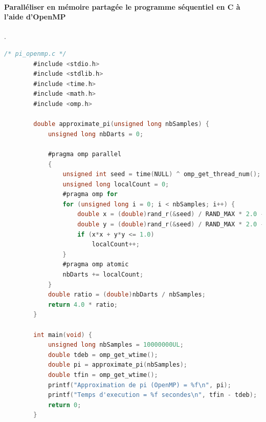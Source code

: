 \documentclass[a4paper,13pt]{book}
\begin{document}
\paragraph{Paralléliser en mémoire partagée le programme séquentiel en C à l'aide d’OpenMP}.\\


	\begin{lstlisting}[language=C]
        /* pi_openmp.c */
        #include <stdio.h>
        #include <stdlib.h>
        #include <time.h>
        #include <math.h>
        #include <omp.h>
        
        double approximate_pi(unsigned long nbSamples) {
            unsigned long nbDarts = 0;
        
            #pragma omp parallel
            {
                unsigned int seed = time(NULL) ^ omp_get_thread_num(); 
                unsigned long localCount = 0;
                #pragma omp for
                for (unsigned long i = 0; i < nbSamples; i++) {
                    double x = (double)rand_r(&seed) / RAND_MAX * 2.0 - 1.0;
                    double y = (double)rand_r(&seed) / RAND_MAX * 2.0 - 1.0;
                    if (x*x + y*y <= 1.0)
                        localCount++;
                }
                #pragma omp atomic
                nbDarts += localCount;
            }
            double ratio = (double)nbDarts / nbSamples;
            return 4.0 * ratio;
        }
        
        int main(void) {
            unsigned long nbSamples = 10000000UL;
            double tdeb = omp_get_wtime();
            double pi = approximate_pi(nbSamples);
            double tfin = omp_get_wtime();
            printf("Approximation de pi (OpenMP) = %f\n", pi);
            printf("Temps d'execution = %f secondes\n", tfin - tdeb);
            return 0;
        }
        
\end{lstlisting}
\end{document}
